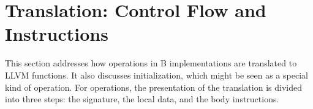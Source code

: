 \documentclass{llncs}
\newcommand{\trad}[2]{\ensuremath{\lVert \textsf{#1} \rVert^{\textit{#2}}}}
\newcommand{\nl}[0]{\text{\Return}}
\DeclareMathOperator{\isdef}{\equiv}
\DeclareMathOperator{\name}{\mathcal{L}()}
\newcommand{\llvm}[1]{\texttt{#1}}
\newcommand{\B}[1]{\textsf{#1}}
\newcommand{\LET}[0]{\textbf{ let }}
\newcommand{\IN}[0]{\textbf{ in }}
\newcommand{\AND}[0]{\textbf{ and }}
\newcommand{\PH}[1]{\framebox{$#1$}}
\newcommand{\sep}[0]{\otimes}
\begin{document}
%

\section{Translation: Control Flow and Instructions
  \label{sec:control}}

This section addresses how operations in B implementations are translated to
LLVM functions. It also discusses initialization, which might be seen as a
special kind of operation. For operations, the presentation of the translation
is divided into three steps: the signature, the local data, and the body
instructions.
\end{document}
